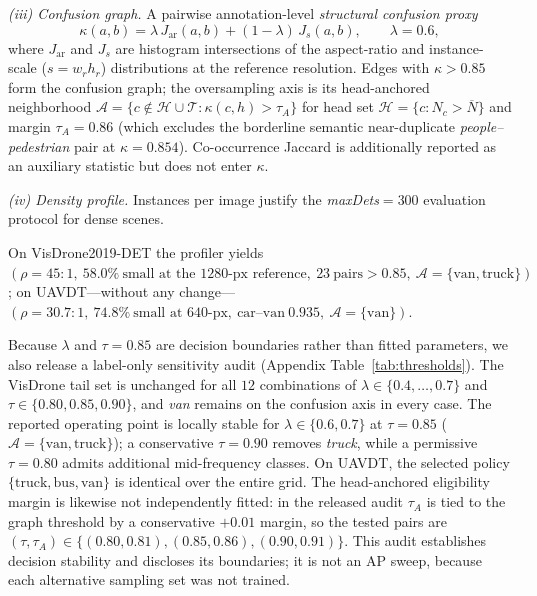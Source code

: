 \documentclass[journal]{IEEEtran}
\newcommand{\visdrone}{VisDrone2019-DET}
\newcommand{\uavdt}{UAVDT}
\begin{document}
\emph{(iii) Confusion graph.} A pairwise annotation-level \emph{structural confusion proxy}
\begin{equation}
\kappa(a,b)=\lambda\,J_{\mathrm{ar}}(a,b)+(1-\lambda)\,J_{s}(a,b),\qquad \lambda=0.6,
\label{eq:conf}
\end{equation}
where $J_{\mathrm{ar}}$ and $J_{s}$ are histogram intersections of the aspect-ratio and instance-scale ($s{=}w_r h_r$) distributions at the reference resolution. Edges with $\kappa>0.85$ form the confusion graph; the oversampling axis is its head-anchored neighborhood $\mathcal{A}=\{c\notin\mathcal{H}\cup\mathcal{T}:\kappa(c,h)>\tau_A\}$ for head set $\mathcal{H}=\{c:N_c>\overline{N}\}$ and margin $\tau_A{=}0.86$ (which excludes the borderline semantic near-duplicate \emph{people--pedestrian} pair at $\kappa{=}0.854$). Co-occurrence Jaccard is additionally reported as an auxiliary statistic but does not enter $\kappa$.

\emph{(iv) Density profile.} Instances per image justify the \emph{maxDets}$=300$ evaluation protocol for dense scenes.

On \visdrone{} the profiler yields $(\rho{=}45{:}1,\ 58.0\%\ \text{small at the 1280-px reference},\ 23\ \text{pairs}>0.85,\ \mathcal{A}=\{\text{van},\text{truck}\})$; on \uavdt{}---without any change---$(\rho{=}30.7{:}1,\ 74.8\%\ \text{small at 640-px},\ \text{car--van}\ 0.935,\ \mathcal{A}=\{\text{van}\})$.

Because $\lambda$ and $\tau=0.85$ are decision boundaries rather than fitted parameters, we also release a label-only sensitivity audit (Appendix Table~\ref{tab:thresholds}). The VisDrone tail set is unchanged for all $12$ combinations of $\lambda\in\{0.4,\ldots,0.7\}$ and $\tau\in\{0.80,0.85,0.90\}$, and \emph{van} remains on the confusion axis in every case. The reported operating point is locally stable for $\lambda\in\{0.6,0.7\}$ at $\tau=0.85$ ($\mathcal{A}=\{\text{van},\text{truck}\}$); a conservative $\tau=0.90$ removes \emph{truck}, while a permissive $\tau=0.80$ admits additional mid-frequency classes. On \uavdt{}, the selected policy $\{\text{truck},\text{bus},\text{van}\}$ is identical over the entire grid. The head-anchored eligibility margin is likewise not independently fitted: in the released audit $\tau_A$ is tied to the graph threshold by a conservative $+0.01$ margin, so the tested pairs are $(\tau,\tau_A)\in\{(0.80,0.81),(0.85,0.86),(0.90,0.91)\}$. This audit establishes decision stability and discloses its boundaries; it is not an AP sweep, because each alternative sampling set was not trained.
\end{document}
